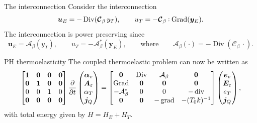 \documentclass[aspectratio=169]{ISAE-Beamer}
\DeclareMathOperator*{\grad}{grad}
\DeclareMathOperator*{\Grad}{Grad}
\DeclareMathOperator*{\Div}{Div}
\renewcommand{\div}{\operatorname{div}}
\newcommand{\where}{\qquad \text{where} \qquad}
\def\onedot{$\mathsurround0pt\ldotp$}
\def\cddot{%
	\mathbin{\vcenter{\baselineskip.67ex
			\hbox{\onedot}\hbox{\onedot}}%
}}
\begin{document}
\begin{frame}{The interconnection}
Consider the  interconnection
\begin{equation*}
\bm{u}_E = - \Div(\bm{\mathcal{C}}_\beta \, y_T), \qquad
u_T = - \bm{\mathcal{C}}_\beta \cddot\Grad(\bm{y}_E). 
\end{equation*}
The interconnection is power preserving since
\begin{equation*}
\bm{u}_E = \mathcal{A}_\beta(y_T), \qquad u_T = - \mathcal{A}_\beta^*(\bm{y}_E), \where  \mathcal{A}_\beta(\cdot) = - \Div(\bm{\mathcal{C}}_\beta \, \cdot).
\end{equation*}
\begin{block}{PH thermoelasticity}
The coupled thermoelastic problem can now be written as
\begin{equation*}
\begin{bmatrix}
\bm{1} & \bm{0} & \bm{0} & \bm{0}\\
\bm{0} & \bm{1} & \bm{0} & \bm{0}\\
0 & 0 & 1 & 0\\
\bm{0} & \bm{0} & \bm{0} & \bm{0}\\
\end{bmatrix}
\diffp{}{t}
\begin{pmatrix}
\bm{\alpha}_v \\
\bm{A}_\varepsilon \\
{\alpha}_T \\
\bm{j}_Q \\
\end{pmatrix} = 
\begin{bmatrix}
\bm{0} & \Div & \mathcal{A}_\beta & \bm{0}\\
\Grad & \bm{0} & \bm{0} & \bm{0} \\
- \mathcal{A}_\beta^* & 0 & 0 & -\div \\
\bm{0} & \bm{0} & -\grad & - (T_0 k)^{-1} \\
\end{bmatrix}
\begin{pmatrix}
\bm{e}_v \\
\bm{E}_\varepsilon \\
{e}_T \\
\bm{j}_Q \\
\end{pmatrix},
\end{equation*}
with total energy given by $H=H_E + H_T$.
\end{block}

\end{frame}
\end{document}
